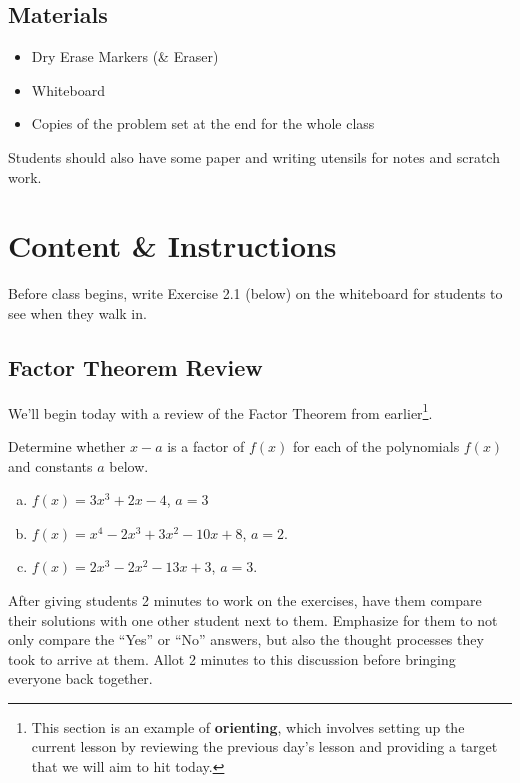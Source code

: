 \subsection{Materials}

\begin{itemize}
    \item Dry Erase Markers (\& Eraser)
    \item Whiteboard
    \item Copies of the problem set at the end for the whole class
\end{itemize}

Students should also have some paper and writing utensils for notes and scratch work.


\newpage

\section{Content \& Instructions}

Before class begins, write Exercise 2.1 (below) on the whiteboard for students to see when they walk in.

\subsection{Factor Theorem Review}

We'll begin today with a review of the Factor Theorem from earlier\footnote{This section is an example of \textbf{orienting}, which involves setting up the current lesson by reviewing the previous day's lesson and providing a target that we will aim to hit today.}.

\begin{exercise}
    \label{exc:21}
    Determine whether $x-a$ is a factor of $f(x)$ for each of the polynomials $f(x)$ and constants $a$ below.
    \begin{enumerate}[(a)]
        \item $f(x) = 3x^3 + 2x-4$, $a = 3$
        \item $f(x) = x^4-2x^3+3x^2-10x+8$, $a = 2$.
        \item $f(x) = 2x^3 - 2x^2 - 13x + 3$, $a = 3$.
    \end{enumerate}
\end{exercise}

After giving students 2 minutes to work on the exercises, have them compare their solutions with one other student next to them. Emphasize for them to not only compare the ``Yes'' or ``No'' answers, but also the thought processes they took to arrive at them. Allot 2 minutes to this discussion before bringing everyone back together.

